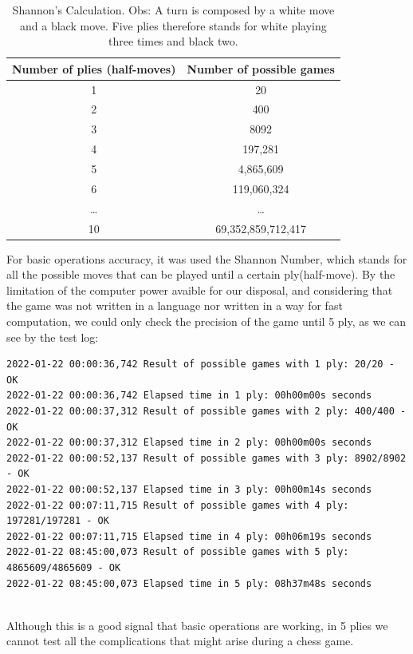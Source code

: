 \documentclass[10pt]{article}
\begin{document}
\begin{table}[H]
\center
\begin{tabular}{|c|c|}
\hline
\textbf{Number of plies (half-moves)}  & \textbf{Number of possible games}  \\
\hline
  1   & 20 \\
\hline
   2  &  400 \\
\hline
  3   & 8092 \\
\hline
4  & 197,281 \\
\hline
5   & 4,865,609 \\
\hline
6   & 119,060,324 \\
\hline
\ldots & \ldots \\
\hline
10 & 69,352,859,712,417 \\
\hline
\end{tabular}
\caption{Shannon's Calculation. Obs: A turn is composed by a white move and a black move. Five plies
therefore stands for white playing three times and black two.}
\end{table}

For basic operations accuracy, it was used the Shannon Number,
which stands for all the possible moves that can be played until a certain
ply(half-move). By the limitation of the computer power avaible for our
disposal, and considering that the game was not written in a language nor
written in a way for fast computation, we could only check the precision of the
game until 5 ply, as we can see by the test log:
\begin{lstlisting}
2022-01-22 00:00:36,742 Result of possible games with 1 ply: 20/20 - OK
2022-01-22 00:00:36,742 Elapsed time in 1 ply: 00h00m00s seconds
2022-01-22 00:00:37,312 Result of possible games with 2 ply: 400/400 - OK
2022-01-22 00:00:37,312 Elapsed time in 2 ply: 00h00m00s seconds
2022-01-22 00:00:52,137 Result of possible games with 3 ply: 8902/8902 - OK
2022-01-22 00:00:52,137 Elapsed time in 3 ply: 00h00m14s seconds
2022-01-22 00:07:11,715 Result of possible games with 4 ply: 197281/197281 - OK
2022-01-22 00:07:11,715 Elapsed time in 4 ply: 00h06m19s seconds
2022-01-22 08:45:00,073 Result of possible games with 5 ply: 4865609/4865609 - OK
2022-01-22 08:45:00,073 Elapsed time in 5 ply: 08h37m48s seconds
    
\end{lstlisting}

Although this is a good signal that basic operations are working, in 5 plies we
cannot test all the complications that might arise during a chess game.
\end{document}
